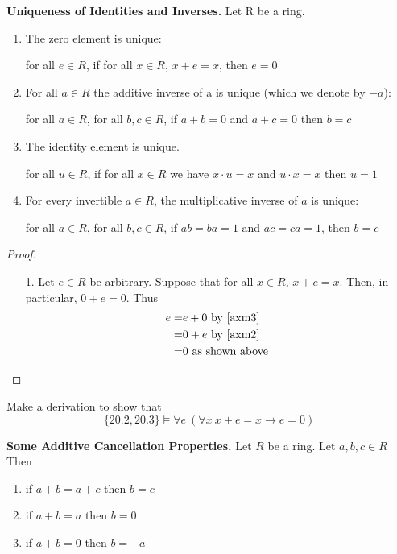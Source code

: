 \begin{thm}
\textbf{Uniqueness of Identities and Inverses.} Let R be a ring.

\begin{enumerate}
\item The zero element is unique:

for all $e\in R$, if for all $x\in R$, $x+e = x$, then $e=0$

\item For all $a\in R$ the additive inverse of a is unique (which we denote by $-a$):

for all $a\in R$, for all $b,c\in R$, if $a+b= 0$ and $a+c = 0$ then $b=c$

\item The identity element is unique.

for all $u\in R$, if for all $x\in R$ we have $x\cdot u = x$ and $u\cdot x = x$ then $u=1$

\item For every invertible $a\in R$, the multiplicative inverse of $a$ is unique:

for all $a\in R$, for all $b,c\in R$, if $ab =ba = 1$ and $ac=ca=1$, then $b=c$
\end{enumerate}
\end{thm}

\begin{proof}
\begin{enumerate}
\item[1.] Let $e\in R$ be arbitrary. Suppose that for all $x\in R$, $x+e = x$. Then, in particular, $0+e = 0$. Thus \begin{align*}
    e = & e + 0 \text{ by \ref{axm3} }\\
    = & 0 + e \text{ by \ref{axm2} } \\
    = & 0 \text{ as shown above }
\end{align*}
\end{enumerate}


\end{proof}

\begin{exer}
Make a derivation to show that \[\{20.2, 20.3\} \vDash \forall e \ (\forall x \  x+e = x \to e = 0)\]
\end{exer}

\begin{thm}
\textbf{Some Additive Cancellation Properties.} Let $R$ be a ring. Let $a,b,c\in R$ Then
\begin{enumerate}
\item if $a+b = a+c$ then $b=c$
\item if $a+b = a$ then $b=0$
\item if $a+b = 0$ then $b = -a$
\end{enumerate}
\end{thm}

